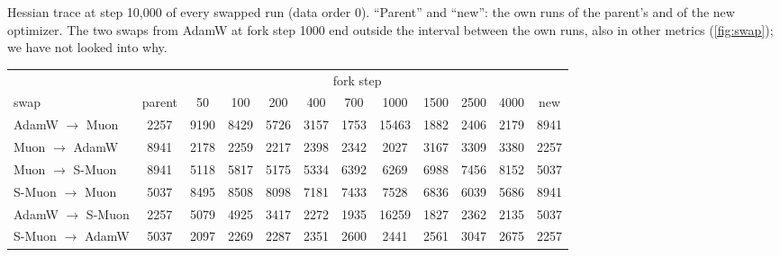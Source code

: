 \begin{center}\small
\captionsetup{type=table}
\caption{Hessian trace at step 10{,}000 of every swapped run (data order 0). ``Parent'' and ``new'': the own runs of
the parent's and of the new optimizer. The two swaps from AdamW at fork step 1000 end outside the interval between the
own runs, also in other metrics (\cref{fig:swap}); we have not looked into why.}
\label{tab:app-swaptrace}
\footnotesize\setlength{\tabcolsep}{4pt}
\begin{tabular}{@{}l|c|ccccccccc|c@{}}
 & & \multicolumn{9}{c|}{fork step} & \\
swap & parent & 50 & 100 & 200 & 400 & 700 & 1000 & 1500 & 2500 & 4000 & new \\
\hline
AdamW $\to$ Muon & 2257 & 9190 & 8429 & 5726 & 3157 & 1753 & 15463 & 1882 & 2406 & 2179 & 8941 \\
Muon $\to$ AdamW & 8941 & 2178 & 2259 & 2217 & 2398 & 2342 & 2027 & 3167 & 3309 & 3380 & 2257 \\
Muon $\to$ S-Muon & 8941 & 5118 & 5817 & 5175 & 5334 & 6392 & 6269 & 6988 & 7456 & 8152 & 5037 \\
S-Muon $\to$ Muon & 5037 & 8495 & 8508 & 8098 & 7181 & 7433 & 7528 & 6836 & 6039 & 5686 & 8941 \\
AdamW $\to$ S-Muon & 2257 & 5079 & 4925 & 3417 & 2272 & 1935 & 16259 & 1827 & 2362 & 2135 & 5037 \\
S-Muon $\to$ AdamW & 5037 & 2097 & 2269 & 2287 & 2351 & 2600 & 2441 & 2561 & 3047 & 2675 & 2257 \\
\hline
\end{tabular}
\end{center}
